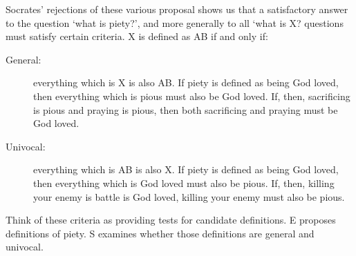 \documentclass[oneside]{article}
\begin{document}
Socrates' rejections of these various proposal shows us that a satisfactory answer to the question `what is piety?', and more generally to all `what is X? questions must satisfy certain criteria. X is defined as AB if and only if: 
\begin{description}
\item[General:] everything which is X is also AB. If piety is defined as being God loved, then everything which is pious must also be God loved. If, then, sacrificing is pious and praying is pious, then both sacrificing and praying must be God loved. 
\item[Univocal:] everything which is AB is also X. If piety is defined as being God loved, then everything which is God loved must also be pious. If, then, killing your enemy is battle is God loved, killing your enemy must also be pious. 
\end{description}
Think of these criteria as providing tests for candidate definitions. E proposes definitions of piety. S examines whether those definitions are general and univocal. 
\end{document}
